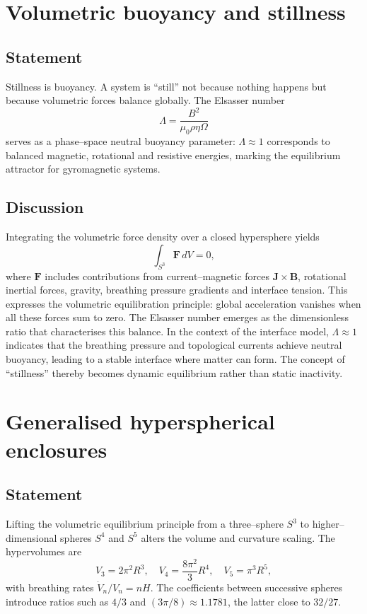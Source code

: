 \documentclass{article}
\begin{document}
\section{Volumetric buoyancy and stillness}
\label{sec:buoyancy}
\subsection{Statement}
Stillness is buoyancy.  A system is ``still'' not because nothing happens but because volumetric forces balance globally.  The Elsasser number
\[
\Lambda = \frac{B^2}{\mu_0 \rho \eta \Omega}
\]
serves as a phase–space neutral buoyancy parameter: $\Lambda \approx 1$ corresponds to balanced magnetic, rotational and resistive energies, marking the equilibrium attractor for gyromagnetic systems.

\subsection{Discussion}
Integrating the volumetric force density over a closed hypersphere yields
\[
\int_{S^3} \mathbf{F}\,dV = 0,
\]
where $\mathbf{F}$ includes contributions from current--magnetic forces $\mathbf{J}\times\mathbf{B}$, rotational inertial forces, gravity, breathing pressure gradients and interface tension.  This expresses the volumetric equilibration principle: global acceleration vanishes when all these forces sum to zero.  The Elsasser number emerges as the dimensionless ratio that characterises this balance.  In the context of the interface model, $\Lambda \approx 1$ indicates that the breathing pressure and topological currents achieve neutral buoyancy, leading to a stable interface where matter can form.  The concept of ``stillness'' thereby becomes dynamic equilibrium rather than static inactivity.

\section{Generalised hyperspherical enclosures}
\label{sec:general}
\subsection{Statement}
Lifting the volumetric equilibrium principle from a three–sphere $S^3$ to higher–dimensional spheres $S^4$ and $S^5$ alters the volume and curvature scaling.  The hypervolumes are
\[
V_3=2\pi^2 R^3, \quad V_4=\frac{8\pi^2}{3} R^4, \quad V_5=\pi^3 R^5,
\]
with breathing rates $\dot{V}_n/V_n = nH$.  The coefficients between successive spheres introduce ratios such as $4/3$ and $(3\pi/8)\approx 1.1781$, the latter close to $32/27$.
\end{document}
